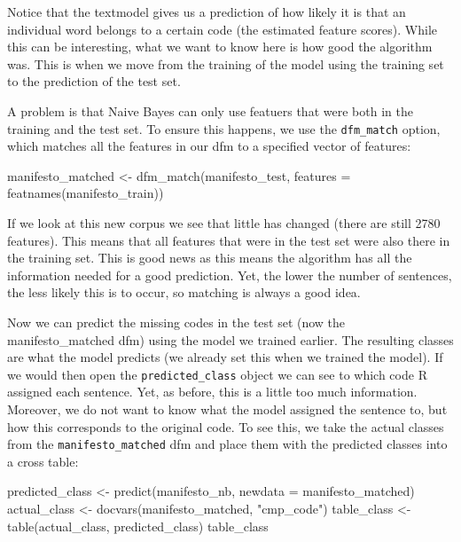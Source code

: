 \documentclass[
]{book}
\newenvironment{Shaded}{\begin{snugshade}}{\end{snugshade}}
\newcommand{\AttributeTok}[1]{\textcolor[rgb]{0.77,0.63,0.00}{#1}}
\newcommand{\FunctionTok}[1]{\textcolor[rgb]{0.00,0.00,0.00}{#1}}
\newcommand{\NormalTok}[1]{#1}
\newcommand{\OtherTok}[1]{\textcolor[rgb]{0.56,0.35,0.01}{#1}}
\newcommand{\StringTok}[1]{\textcolor[rgb]{0.31,0.60,0.02}{#1}}
\begin{document}
Notice that the textmodel gives us a prediction of how likely it is that an individual word belongs to a certain code (the estimated feature scores). While this can be interesting, what we want to know here is how good the algorithm was. This is when we move from the training of the model using the training set to the prediction of the test set.

A problem is that Naive Bayes can only use featuers that were both in the training and the test set. To ensure this happens, we use the \texttt{dfm\_match} option, which matches all the features in our dfm to a specified vector of features:

\begin{Shaded}
\begin{Highlighting}[]
\NormalTok{manifesto\_matched }\OtherTok{\textless{}{-}} \FunctionTok{dfm\_match}\NormalTok{(manifesto\_test, }\AttributeTok{features =} \FunctionTok{featnames}\NormalTok{(manifesto\_train))}
\end{Highlighting}
\end{Shaded}

If we look at this new corpus we see that little has changed (there are still 2780 features). This means that all features that were in the test set were also there in the training set. This is good news as this means the algorithm has all the information needed for a good prediction. Yet, the lower the number of sentences, the less likely this is to occur, so matching is always a good idea.

Now we can predict the missing codes in the test set (now the manifesto\_matched dfm) using the model we trained earlier. The resulting classes are what the model predicts (we already set this when we trained the model). If we would then open the \texttt{predicted\_class} object we can see to which code R assigned each sentence. Yet, as before, this is a little too much information. Moreover, we do not want to know what the model assigned the sentence to, but how this corresponds to the original code. To see this, we take the actual classes from the \texttt{manifesto\_matched} dfm and place them with the predicted classes into a cross table:

\begin{Shaded}
\begin{Highlighting}[]
\NormalTok{predicted\_class }\OtherTok{\textless{}{-}} \FunctionTok{predict}\NormalTok{(manifesto\_nb, }\AttributeTok{newdata =}\NormalTok{ manifesto\_matched)}
\NormalTok{actual\_class }\OtherTok{\textless{}{-}} \FunctionTok{docvars}\NormalTok{(manifesto\_matched, }\StringTok{"cmp\_code"}\NormalTok{)}
\NormalTok{table\_class }\OtherTok{\textless{}{-}} \FunctionTok{table}\NormalTok{(actual\_class, predicted\_class)}
\NormalTok{table\_class}
\end{Highlighting}
\end{Shaded}
\end{document}
